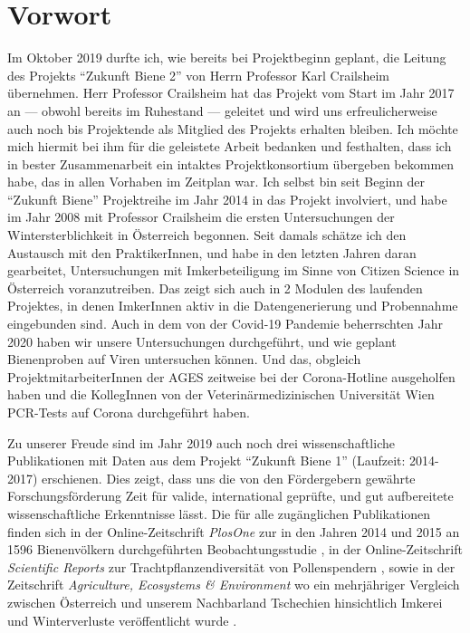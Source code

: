 {}
\section*{Vorwort}

Im Oktober 2019 durfte ich, wie bereits bei Projektbeginn geplant, die Leitung des Projekts \enquote{Zukunft Biene 2} von Herrn Professor Karl Crailsheim übernehmen. Herr Professor Crailsheim hat das Projekt vom Start im Jahr 2017 an --- obwohl bereits im Ruhestand --- geleitet und wird uns erfreulicherweise auch noch bis Projektende als Mitglied des Projekts erhalten bleiben. Ich möchte mich hiermit bei ihm für die geleistete Arbeit bedanken und festhalten, dass ich in bester Zusammenarbeit ein intaktes Projektkonsortium übergeben bekommen habe, das in allen Vorhaben im Zeitplan war. Ich selbst bin seit Beginn der \enquote{Zukunft Biene} Projektreihe im Jahr 2014 in das Projekt involviert, und habe im Jahr 2008 mit Professor Crailsheim die ersten Untersuchungen der Wintersterblichkeit in Österreich begonnen. Seit damals schätze ich den Austausch mit den PraktikerInnen, und habe in den letzten Jahren daran gearbeitet, Untersuchungen mit Imkerbeteiligung im Sinne von Citizen Science in Österreich voranzutreiben. Das zeigt sich auch in 2 Modulen des laufenden Projektes, in denen ImkerInnen aktiv in die Datengenerierung und Probennahme eingebunden sind. Auch in dem von der Covid-19 Pandemie beherrschten Jahr 2020 haben wir unsere Untersuchungen durchgeführt, und wie geplant Bienenproben auf Viren untersuchen können. Und das, obgleich ProjektmitarbeiterInnen der AGES zeitweise bei der Corona-Hotline ausgeholfen haben und die KollegInnen von der Veterinärmedizinischen Universität Wien PCR-Tests auf Corona durchgeführt haben.

Zu unserer Freude sind im Jahr 2019 auch noch drei wissenschaftliche Publikationen mit Daten aus dem Projekt \enquote{Zukunft Biene 1} (Laufzeit: 2014-2017) erschienen. Dies zeigt, dass uns die von den Fördergebern gewährte Forschungsförderung Zeit für valide, international geprüfte, und gut aufbereitete wissenschaftliche Erkenntnisse lässt. Die für alle zugänglichen Publikationen finden sich in der Online-Zeitschrift \textit{PlosOne} zur in den Jahren 2014 und 2015 an 1596 Bienenvölkern durchgeführten
Beobachtungsstudie \citep{morawetz2019}, in der Online-Zeitschrift \textit{Scientific Reports} zur Trachtpflanzendiversität von Pollenspendern \citep{brodschneider2019a}, sowie in der Zeitschrift \textit{Agriculture, Ecosystems \& Environment} wo ein mehrjähriger Vergleich zwischen Österreich und unserem Nachbarland Tschechien hinsichtlich Imkerei und Winterverluste veröffentlicht wurde \citep{brodschneider2019}.

